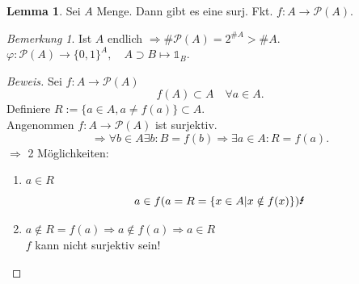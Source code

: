 \documentclass[12pt,a4paper,titlepage]{article} %
\theoremstyle{definition}
\newtheorem{lem}[satz]{Lemma}
\theoremstyle{remark}
\newtheorem*{bem}{Bemerkung}
\newenvironment{bew}{\begin{proof}[Beweis]}{\end{proof}}
\begin{document}
\begin{lem}
	Sei \(A\) Menge. Dann gibt es eine surj. Fkt. \(f: A\rightarrow \mathcal{P}(A) \).
\end{lem}
\begin{bem}
	Ist \(A\) endlich \( \Rightarrow \# \mathcal{P} (A) = 2^{\# A} > \#A \).\\
	\( \varphi: \mathcal{P}(A) \rightarrow \{0,1\}^A, \quad A\supset B \mapsto \mathds{1}_B \).
\end{bem}
\begin{bew}
	Sei \(f: A \rightarrow \mathcal{P}(A) \)
	\[ f(A) \subset A \quad \forall a \in A. \]
	Definiere \(R := \{a\in A, a \neq f(a)\} \subset A \).\\
	Angenommen \(f: A \rightarrow \mathcal{P}(A) \) ist surjektiv.
	\[ \Rightarrow \forall b\in A \exists b : B=f(b) \Rightarrow \exists a\in A : R = f(a). \]
	\(\Rightarrow\) 2 Möglichkeiten:
	\begin{enumerate}
		\item \(a\in R\) \[ a\in f(a = R = \{x\in A| x\notin f(x)\}) \text{\Lightning} \]
		\item \(a \notin R = f(a) \Rightarrow a \notin f(a) \Rightarrow a\in R \) \Lightning\\
		\( f\) kann nicht surjektiv sein!
	\end{enumerate}
\end{bew}


\newpage
\section{}
\end{document}
